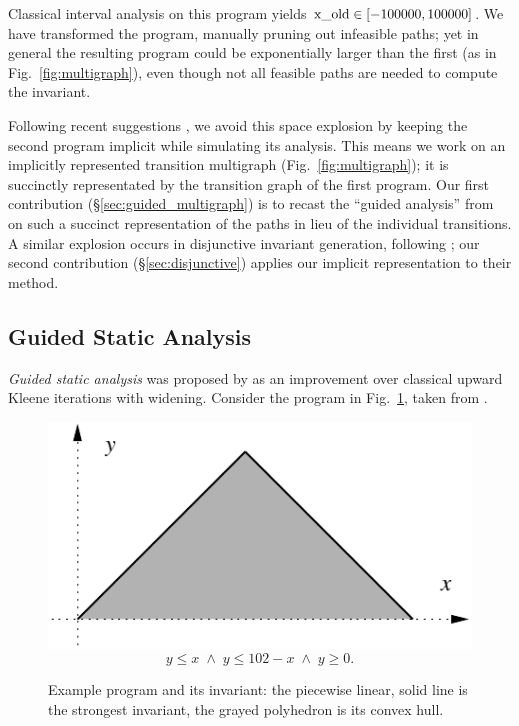 \documentclass{llncs}
\newcommand{\avirer}[1]{{\color{red} #1}}
\newcommand{\avirer}[1]{}
\begin{document}
Classical interval analysis on this program yields $\lstinline|x_old| \in [-100000,100000]$.
We have transformed the program, manually pruning out infeasible paths; yet in general the resulting program could be exponentially larger than the first \avirer{(as in Fig.~\ref{fig:multigraph})}, even though not all feasible paths are needed to compute the invariant.

Following recent suggestions \cite{Gawlitza_Monniaux_ESOP11,Monniaux_Gonnord_SAS11}, we avoid this space explosion by keeping the second program implicit while simulating its analysis. This means we work on an implicitly represented transition multigraph \avirer{(Fig.~\ref{fig:multigraph})}; it is succinctly representated by the transition graph of the first program.
Our first contribution (\S\ref{sec:guided_multigraph}) is to recast the ``guided analysis'' from \cite{DBLP:conf/sas/GopanR07} on such a succinct representation of the paths in lieu of the individual transitions.
A similar explosion occurs in disjunctive invariant generation, following \cite{DBLP:conf/pldi/GulwaniZ10}; our second contribution (\S\ref{sec:disjunctive}) applies our implicit representation to their method.


\subsection{Guided Static Analysis}
\label{sec:guided}
\emph{Guided static analysis} was proposed by \cite{DBLP:conf/sas/GopanR07} as an improvement over classical upward Kleene iterations with widening.
Consider the program in Fig.~\ref{fig:gopan_reps_invariant}, taken from \cite{DBLP:conf/sas/GopanR07}.

\begin{figure}
  \vspace{-1em}
  \begin{minipage}{.3\linewidth}
    
  \end{minipage}
\hfill
\begin{minipage}{.5\linewidth}
\includegraphics[scale=0.7]{gopan_reps}
\vspace{-1em}
\begin{equation}
y \leq x \;\land\; y \leq 102-x \;\land\; y \geq 0.\label{eqn:triangle}
\end{equation}
\end{minipage}
\caption{Example program and its invariant: the piecewise linear, solid line is the strongest invariant, the grayed polyhedron is its convex hull.}
\label{fig:gopan_reps_invariant} 
\end{figure}
\end{document}
